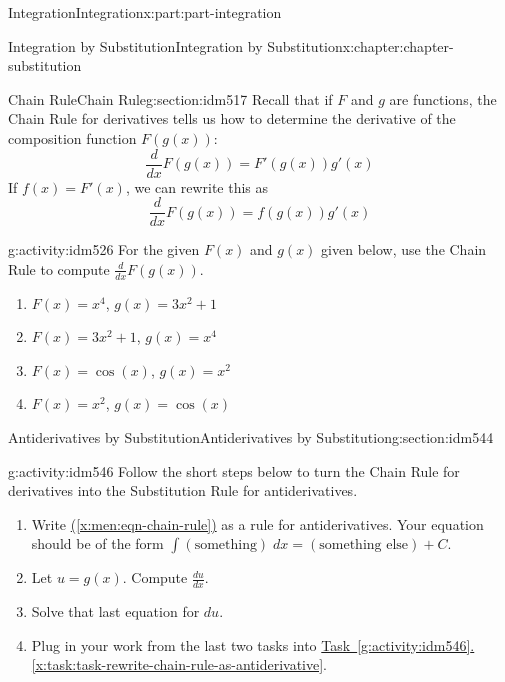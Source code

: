 \documentclass[oneside,10pt,]{book}
\numberwithin{equation}{section}
\begin{document}
\begin{partptx}{Integration}{}{Integration}{}{}{x:part:part-integration}
\begin{chapterptx}{Integration by Substitution}{}{Integration by Substitution}{}{}{x:chapter:chapter-substitution}
\begin{sectionptx}{Chain Rule}{}{Chain Rule}{}{}{g:section:idm517}
Recall that if \(F\) and \(g\) are functions, the Chain Rule for derivatives tells us how to determine the derivative of the composition function \(F(g(x))\):%
\begin{equation*}
\frac{d}{dx}F(g(x)) = F'(g(x))g'(x)
\end{equation*}
If \(f(x) = F'(x)\), we can rewrite this as%
\begin{equation}
\frac{d}{dx}F(g(x)) = f(g(x))g'(x)\label{x:men:eqn-chain-rule}
\end{equation}
%
\begin{activity}{}{g:activity:idm526}%
For the given \(F(x)\) and \(g(x)\) given below, use the Chain Rule to compute \(\displaystyle \frac{d}{dx}F(g(x))\).%
\begin{enumerate}[font=\bfseries,label=(\alph*),ref=\alph*]
\item{}\(F(x) = x^4\), \(g(x) = 3x^2+1\)\item{}\(F(x) = 3x^2+1\), \(g(x) = x^4\)\item{}\(F(x) = \cos(x)\), \(g(x) = x^2\)\item{}\(F(x) = x^2\), \(g(x) = \cos(x)\)\end{enumerate}
\end{activity}
\end{sectionptx}
%
%
\typeout{************************************************}
\typeout{************************************************}
%
\begin{sectionptx}{Antiderivatives by Substitution}{}{Antiderivatives by Substitution}{}{}{g:section:idm544}
\begin{activity}{}{g:activity:idm546}%
Follow the short steps below to turn the Chain Rule for derivatives into the Substitution Rule for antiderivatives.%
\begin{enumerate}[font=\bfseries,label=(\alph*),ref=\alph*]
\item\label{x:task:task-rewrite-chain-rule-as-antiderivative}Write \hyperref[x:men:eqn-chain-rule]{(\ref{x:men:eqn-chain-rule})} as a rule for antiderivatives. Your equation should be of the form \(\displaystyle \int (\textrm{something})\;dx = (\textrm{something else}) + C\).%
\item{}Let \(u = g(x)\). Compute \(\displaystyle \frac{du}{dx}\).%
\item{}Solve that last equation for \(du\).%
\item{}Plug in your work from the last two tasks into \hyperref[x:task:task-rewrite-chain-rule-as-antiderivative]{Task~\ref{g:activity:idm546}.\ref{x:task:task-rewrite-chain-rule-as-antiderivative}}.%

\end{enumerate}
\end{activity}
\end{sectionptx}
\end{chapterptx}
\end{partptx}
\end{document}
